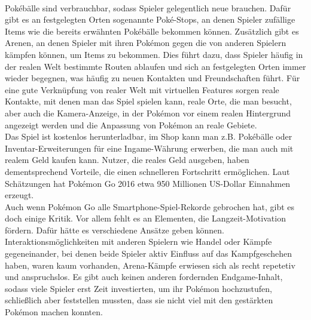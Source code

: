 \documentclass[extern,palatino]{cgBA}
\begin{document}
	\\Pokébälle sind verbrauchbar, sodass Spieler gelegentlich neue brauchen. Dafür gibt es an festgelegten Orten sogenannte Poké-Stops, an denen Spieler zufällige Items wie die bereits erwähnten Pokébälle bekommen können. Zusätzlich gibt es Arenen, an denen Spieler mit ihren Pokémon gegen die von anderen Spielern kämpfen können, um Items zu bekommen. Dies führt dazu, dass Spieler häufig in der realen Welt bestimmte Routen ablaufen und sich an festgelegten Orten immer wieder begegnen, was häufig zu neuen Kontakten und Freundschaften führt\cite{posoc}. Für eine gute Verknüpfung von realer Welt mit virtuellen Features sorgen reale Kontakte, mit denen man das Spiel spielen kann, reale Orte, die man besucht, aber auch die Kamera-Anzeige, in der Pokémon vor einem realen Hintergrund angezeigt werden und die Anpassung von Pokémon an reale Gebiete.
	\\Das Spiel ist kostenlos herunterladbar, im Shop kann man z.B. Pokébälle oder Inventar-Erweiterungen für eine Ingame-Währung erwerben, die man auch mit realem Geld kaufen kann. Nutzer, die reales Geld ausgeben, haben dementsprechend Vorteile, die einen schnelleren Fortschritt ermöglichen. Laut Schätzungen hat Pokémon Go 2016 etwa 950 Millionen US-Dollar Einnahmen\cite{poven} erzeugt.
	\\Auch wenn Pokémon Go alle Smartphone-Spiel-Rekorde gebrochen hat, gibt es doch einige Kritik. Vor allem fehlt es an Elementen, die Langzeit-Motivation fördern\cite{pofor}. Dafür hätte es verschiedene Ansätze geben können. Interaktionsmöglichkeiten mit anderen Spielern wie Handel oder Kämpfe gegeneinander, bei denen beide Spieler aktiv Einfluss auf das Kampfgeschehen haben, waren kaum vorhanden, Arena-Kämpfe erwiesen sich als recht repetetiv und anspruchslos. Es gibt auch keinen anderen fordernden Endgame-Inhalt, sodass viele Spieler erst Zeit investierten, um ihr Pokémon hochzustufen, schließlich aber feststellen mussten, dass sie nicht viel mit den gestärkten Pokémon machen konnten\cite{pofor}.
	\newpage
	
\end{document}
